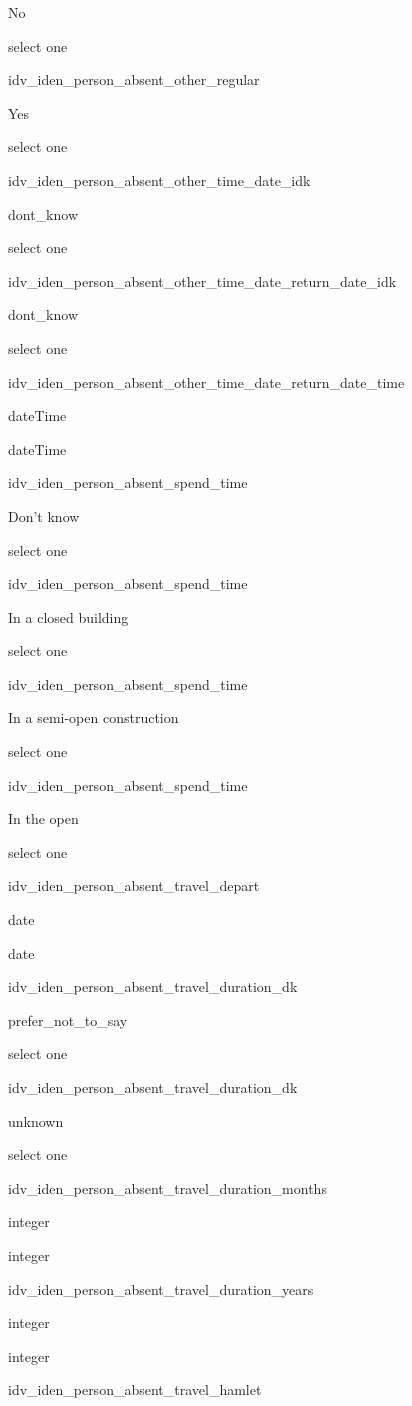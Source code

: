 \documentclass[]{article}
\begin{document}
No

select one

idv\_iden\_person\_absent\_other\_regular

Yes

select one

idv\_iden\_person\_absent\_other\_time\_date\_idk

dont\_know

select one

idv\_iden\_person\_absent\_other\_time\_date\_return\_date\_idk

dont\_know

select one

idv\_iden\_person\_absent\_other\_time\_date\_return\_date\_time

dateTime

dateTime

idv\_iden\_person\_absent\_spend\_time

Don't know

select one

idv\_iden\_person\_absent\_spend\_time

In a closed building

select one

idv\_iden\_person\_absent\_spend\_time

In a semi-open construction

select one

idv\_iden\_person\_absent\_spend\_time

In the open

select one

idv\_iden\_person\_absent\_travel\_depart

date

date

idv\_iden\_person\_absent\_travel\_duration\_dk

prefer\_not\_to\_say

select one

idv\_iden\_person\_absent\_travel\_duration\_dk

unknown

select one

idv\_iden\_person\_absent\_travel\_duration\_months

integer

integer

idv\_iden\_person\_absent\_travel\_duration\_years

integer

integer

idv\_iden\_person\_absent\_travel\_hamlet
\end{document}

